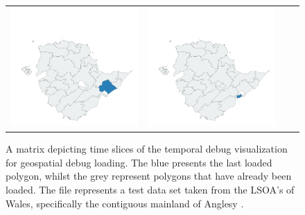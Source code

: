 \begin{figure}
\begin{tabularx}{1\textwidth}{XXXX}
\includegraphics[width=1\linewidth]{images/ch6/loading/19}&
\includegraphics[width=1\linewidth]{images/ch6/loading/20} \\
\end{tabularx}
\caption{A matrix depicting time slices of the temporal debug visualization for geospatial debug loading. The blue presents the last loaded polygon, whilst the grey represent polygons that have already been loaded. The file represents a test data set taken from the LSOA's of Wales, specifically the contiguous mainland of Anglesy \cite{wales}.} \label{fig:loadingMatrix}
\end{figure}

